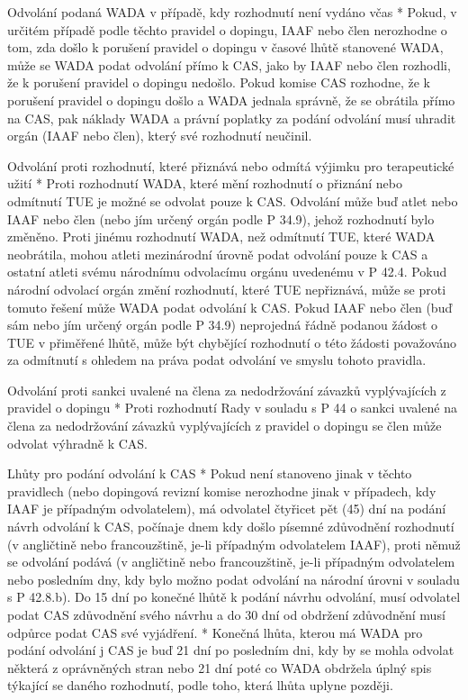 Odvolání podaná WADA v případě, kdy rozhodnutí není vydáno včas
* Pokud, v určitém případě podle těchto pravidel o dopingu, IAAF nebo člen nerozhodne o tom, zda došlo k porušení pravidel o dopingu v časové lhůtě stanovené WADA, může se WADA podat odvolání přímo k CAS, jako by IAAF nebo člen rozhodli, že k porušení pravidel o dopingu  nedošlo.  Pokud komise CAS rozhodne, že k porušení pravidel o dopingu došlo a WADA jednala správně, že se obrátila přímo na CAS, pak náklady WADA a právní poplatky za podání odvolání musí uhradit orgán (IAAF nebo člen), který své rozhodnutí neučinil.

Odvolání proti rozhodnutí, které přiznává nebo odmítá výjimku pro terapeutické užití
* Proti rozhodnutí WADA, které mění rozhodnutí o přiznání nebo odmítnutí TUE je možné se odvolat pouze k CAS. Odvolání může buď atlet nebo IAAF nebo člen (nebo jím určený orgán podle P 34.9), jehož rozhodnutí bylo změněno. Proti jinému rozhodnutí WADA, než odmítnutí TUE, které WADA neobrátila, mohou atleti mezinárodní úrovně podat odvolání pouze k CAS a ostatní atleti svému národnímu odvolacímu orgánu uvedenému v P 42.4. Pokud národní odvolací orgán změní rozhodnutí, které TUE nepřiznává, může se proti tomuto řešení může WADA podat odvolání k CAS. Pokud IAAF nebo člen (buď sám nebo jím určený orgán podle P 34.9) neprojedná řádně podanou žádost o TUE v přiměřené lhůtě, může být chybějící rozhodnutí o této žádosti považováno za odmítnutí s ohledem na práva podat odvolání ve smyslu tohoto pravidla.

Odvolání proti sankci uvalené na člena za nedodržování závazků vyplývajících z pravidel o dopingu
* Proti rozhodnutí Rady v souladu s P 44 o sankci uvalené na člena za nedodržování závazků vyplývajících z pravidel o dopingu se člen může odvolat výhradně k CAS.

Lhůty pro podání odvolání k CAS
* Pokud není stanoveno jinak v těchto pravidlech (nebo dopingová revizní komise nerozhodne jinak v případech, kdy IAAF je případným odvolatelem), má odvolatel čtyřicet pět (45) dní na podání návrh odvolání k CAS, počínaje dnem kdy došlo písemné zdůvodnění rozhodnutí (v angličtině nebo francouzštině, je-li  případným odvolatelem IAAF), proti němuž se odvolání podává (v angličtině nebo francouzštině, je-li  případným odvolatelem nebo  posledním dny, kdy bylo možno podat odvolání na národní úrovni v souladu s P 42.8.b). Do 15 dní po konečné lhůtě k podání návrhu odvolání, musí odvolatel podat CAS zdůvodnění svého návrhu a do 30 dní od obdržení zdůvodnění musí odpůrce podat CAS své vyjádření.
* Konečná lhůta, kterou má WADA pro podání odvolání j CAS je buď 21 dní po posledním dni, kdy by se mohla odvolat některá z oprávněných stran nebo 21 dní poté co WADA obdržela úplný spis týkající se daného rozhodnutí, podle toho, která lhůta uplyne později.

